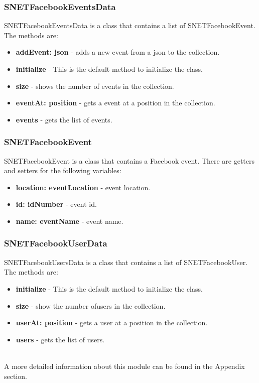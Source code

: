 \subsubsection{SNETFacebookEventsData}
\label{sec-1-5-12}
SNETFacebookEventsData is a class that contains a list of SNETFacebookEvent. The methods are:
\begin{itemize}
\item \textbf{addEvent: json} - adds a new event from a json to the collection.
\item \textbf{initialize} - This is the default method to initialize the class.
\item \textbf{size} - shows the number of events in the collection.
\item \textbf{eventAt: position} - gets a event at a position in the collection.
\item \textbf{events} - gets the list of events.
\end{itemize}


\subsubsection{SNETFacebookEvent}
\label{sec-1-5-13}
SNETFacebookEvent is a class that contains a Facebook event. There are getters and setters for the following variables:
\begin{itemize}
\item \textbf{location: eventLocation} - event location.
\item \textbf{id: idNumber} - event id.
\item \textbf{name: eventName} - event name.
\end{itemize}


\subsubsection{SNETFacebookUserData}
\label{sec-1-5-14}
SNETFacebookUsersData is a class that contains a list of SNETFacebookUser. The methods are:
\begin{itemize}
\item \textbf{initialize} - This is the default method to initialize the class.
\item \textbf{size} - show the number ofusers in the collection.
\item \textbf{userAt: position} - gets a user at a position in the collection.
\item \textbf{users} - gets the list of users.
\end{itemize}
\\
A more detailed information about this module can be found in the Appendix section.
